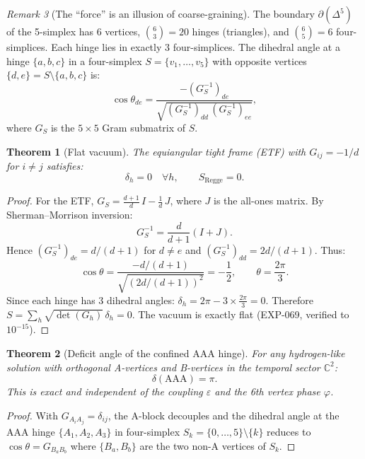 \documentclass[12pt]{article}
\newtheorem{theorem}{Theorem}[section]
\theoremstyle{remark}
\newtheorem{remark}[theorem]{Remark}
\theoremstyle{definition}
\newcommand{\CC}{\mathbb{C}}
\begin{document}
\begin{remark}[The ``force'' is an illusion of coarse-graining]
The boundary $\partial(\Delta^5)$ of the 5-simplex has 6 vertices, $\binom{6}{3}=20$ hinges (triangles), and $\binom{6}{5}=6$ four-simplices.  Each hinge lies in exactly 3 four-simplices.  The dihedral angle at a hinge $\{a,b,c\}$ in a four-simplex $S = \{v_1,\ldots,v_5\}$ with opposite vertices $\{d,e\} = S \setminus \{a,b,c\}$ is:
\begin{equation}
\cos\theta_{de} = \frac{-(G^{-1}_S)_{de}}{\sqrt{(G^{-1}_S)_{dd}\,(G^{-1}_S)_{ee}}},
\end{equation}
where $G_S$ is the $5 \times 5$ Gram submatrix of $S$.

\begin{theorem}[Flat vacuum]
\label{thm:flat_vacuum}
The equiangular tight frame (ETF) with $G_{ij} = -1/d$ for $i \ne j$ satisfies:
\begin{equation}
\delta_h = 0 \quad \forall h, \qquad S_{\mathrm{Regge}} = 0.
\end{equation}
\end{theorem}
\begin{proof}
For the ETF, $G_S = \frac{d+1}{d}\,I - \frac{1}{d}\,J$, where $J$ is the all-ones matrix.  By Sherman--Morrison inversion:
\begin{equation}
G_S^{-1} = \frac{d}{d+1}(I + J).
\end{equation}
Hence $(G^{-1}_S)_{de} = d/(d+1)$ for $d \ne e$ and $(G^{-1}_S)_{dd} = 2d/(d+1)$.  Thus:
\begin{equation}
\cos\theta = \frac{-d/(d+1)}{\sqrt{(2d/(d+1))^2}} = -\frac{1}{2}, \qquad \theta = \frac{2\pi}{3}.
\end{equation}
Since each hinge has 3 dihedral angles: $\delta_h = 2\pi - 3 \times \frac{2\pi}{3} = 0$.  Therefore $S = \sum_h \sqrt{\det(G_h)}\,\delta_h = 0$.  The vacuum is exactly flat (EXP-069, verified to $10^{-15}$).
\end{proof}

\begin{theorem}[Deficit angle of the confined AAA hinge]
\label{thm:delta_AAA}
For any hydrogen-like solution with orthogonal A-vertices and B-vertices in the temporal sector $\CC^2$:
\begin{equation}
\boxed{\delta(\mathrm{AAA}) = \pi.}
\end{equation}
This is exact and independent of the coupling $\varepsilon$ and the 6th vertex phase $\varphi$.
\end{theorem}
\begin{proof}
With $G_{A_i A_j} = \delta_{ij}$, the A-block decouples and the dihedral angle at the AAA hinge $\{A_1,A_2,A_3\}$ in four-simplex $S_k = \{0,\ldots,5\}\setminus\{k\}$ reduces to $\cos\theta = G_{B_a B_b}$ where $\{B_a,B_b\}$ are the two non-A vertices of $S_k$.


\end{proof}
\end{remark}
\end{document}
